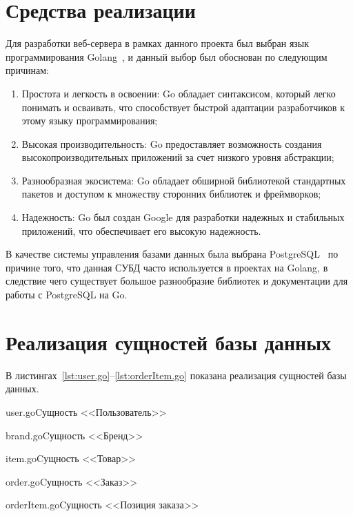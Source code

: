 \documentclass{bmstu}
\begin{document}
\section{Средства реализации}

Для разработки веб-сервера в рамках данного проекта был выбран язык программирования Golang~\cite{Go}, и данный выбор был обоснован по следующим причинам:

\begin{enumerate}
	\item Простота и легкость в освоении: Go обладает синтаксисом, который легко понимать и осваивать, что способствует быстрой адаптации разработчиков к этому языку программирования;
	\item Высокая производительность: Go предоставляет возможность создания высокопроизводительных приложений за счет низкого уровня абстракции;
	\item Разнообразная экосистема: Go обладает обширной библиотекой стандартных пакетов и доступом к множеству сторонних библиотек и фреймворков;
	\item Надежность: Go был создан Google для разработки надежных и стабильных приложений, что обеспечивает его высокую надежность.
\end{enumerate}

В качестве системы управления базами данных была выбрана PostgreSQL~\cite{Postgres} по причине того, что данная СУБД часто используется в проектах на Golang, в следствие чего существует большое разнообразие библиотек и документации для работы с PostgreSQL на Go.

\pagebreak

\section{Реализация сущностей базы данных}

В листингах~\ref{lst:user.go}--\ref{lst:orderItem.go} показана реализация сущностей базы данных.

{user.go}{Cущность <<Пользователь>>}

{brand.go}{Cущность <<Бренд>>}

{item.go}{Cущность <<Товар>>}

\pagebreak

{order.go}{Cущность <<Заказ>>}

{orderItem.go}{Cущность <<Позиция заказа>>}
\end{document}
